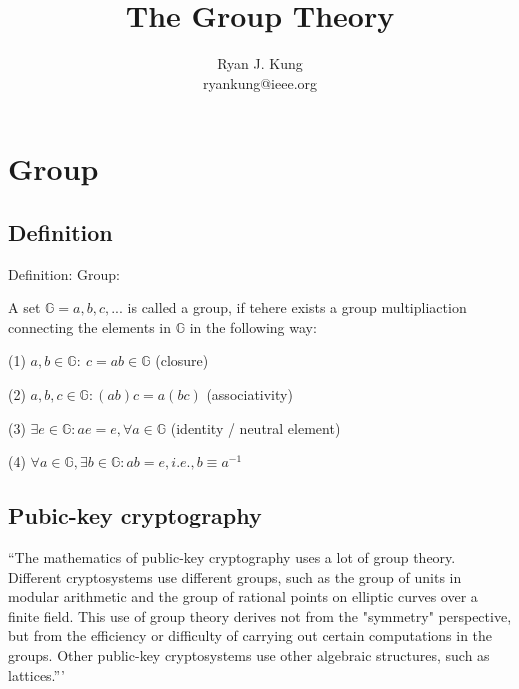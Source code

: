 \documentclass{article}
\author{Ryan J. Kung \\ryankung@ieee.org}
\title{The Group Theory}
\begin{document}
\maketitle
\section{Group}
\subsection{Definition}
Definition: Group\cite{Cardelli:1996:TS:234313.234418}:

A set $\mathbb{G}={a, b, c, ...}$ is called a group, if tehere exists a group multipliaction connecting the elements in $\mathbb{G}$ in the following way:

(1) $a, b \in \mathbb{G}:\ c=a b \in \mathbb{G}$ (closure)

(2) $a, b, c \in \mathbb{G}: (ab)c=a(bc)$ (associativity)

(3) $\exists e \in \mathbb{G}: ae=e, \forall a \in \mathbb{G}$ (identity / neutral element)

(4) $\forall a \in \mathbb{G}, \exists b \in \mathbb{G}: ab=e, i.e., b\equiv a^{-1}$

\subsection{Pubic-key cryptography}
``The mathematics of public-key cryptography uses a lot of group theory. Different cryptosystems use different groups, such as the group of units in modular arithmetic and the group of rational points on elliptic curves over a finite field. This use of group theory derives not from the "symmetry" perspective, but from the efficiency or difficulty of carrying out certain computations in the groups. Other public-key cryptosystems use other algebraic structures, such as lattices.''' \cite{Cardelli:1996:TS:234313.234418}


\end{document}
